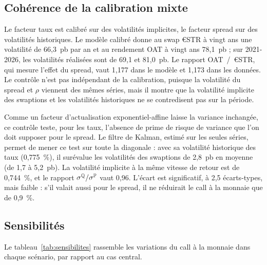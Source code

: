 \subsection{Cohérence de la calibration mixte}

Le facteur taux est calibré sur des volatilités implicites, le facteur spread sur des volatilités historiques. Le
modèle calibré donne au swap €STR à vingt ans une volatilité de 66,3~pb par an et au rendement OAT à vingt ans
78,1~pb ; sur 2021-2026, les volatilités réalisées sont de 69,1 et 81,0~pb. Le rapport OAT~/~€STR, qui mesure
l'effet du spread, vaut 1,177 dans le modèle et 1,173 dans les données. Le contrôle n'est pas indépendant de la
calibration, puisque la volatilité du spread et $\rho$ viennent des mêmes séries, mais il montre que la volatilité
implicite des swaptions et les volatilités historiques ne se contredisent pas sur la période.

Comme un facteur d'actualisation exponentiel-affine laisse la variance inchangée, ce contrôle teste, pour les taux,
l'absence de prime de risque de variance que l'on doit supposer pour le spread. Le filtre de Kalman, estimé sur les
seules séries, permet de mener ce test sur toute la diagonale : avec sa volatilité historique des taux (0,775~\%),
il surévalue les volatilités des swaptions de 2,8~pb en moyenne (de 1,7 à 5,2~pb). La volatilité implicite à la
même vitesse de retour est de 0,744~\%, et le rapport $\sigma^{\mathbb{Q}}/\sigma^{\mathbb{P}}$ vaut 0,96. L'écart est
significatif, à 2,5 écarts-types, mais faible : s'il valait aussi pour le spread, il ne réduirait le call à la
monnaie que de 0,9~\%.

\subsection{Sensibilités}

Le tableau~\ref{tab:sensibilites} rassemble les variations du call à la monnaie dans chaque scénario, par rapport
au cas central.

